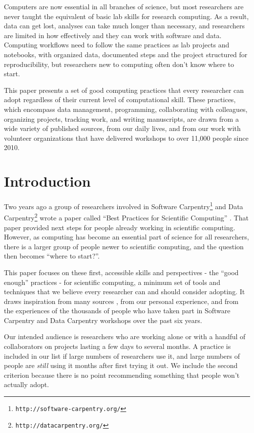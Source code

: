 \documentclass[10pt,letterpaper]{article}
\newcommand{\withurl}[2]{{#1}\footnote{{\texttt{#2}}}}
\begin{document}
Computers are now essential in all branches of science, but most
researchers are never taught the equivalent of basic lab skills for
research computing. As a result, data can get lost, analyses can take
much longer than necessary, and researchers are limited in how
effectively and they can work with software and data. Computing
workflows need to follow the same practices as lab projects and
notebooks, with organized data, documented steps and the project
structured for reproducibility, but researchers new to computing often
don't know where to start.

This paper presents a set of good computing practices that every
researcher can adopt regardless of their current level of
computational skill.  These practices, which encompass data
management, programming, collaborating with colleagues, organizing
projects, tracking work, and writing manuscripts, are drawn from a
wide variety of published sources, from our daily lives, and from our
work with volunteer organizations that have delivered workshops to
over 11,000 people since 2010.

\linenumbers

\section*{Introduction}\label{sec:introduction}

Two years ago a group of researchers involved in \withurl{Software
Carpentry}{http://software-carpentry.org/} and \withurl{Data
Carpentry}{http://datacarpentry.org/} wrote a paper called ``Best
Practices for Scientific Computing'' \cite{wilson2014}.  That paper
provided next steps for people already working in scientific
computing. However, as computing has become an essential part of
science for all researchers, there is a larger group of people newer
to scientific computing, and the question then becomes ``where to
start?''.

This paper focuses on these first, accessible skills and perspectives
- the ``good enough'' practices - for scientific computing, a minimum
set of tools and techniques that we believe every researcher can and
should consider adopting. It draws inspiration from many sources
\cite{gentzkow2014,noble2009,brown2015,wickham2014,kitzes2016,sandve2013,hart2016},
from our personal experience, and from the experiences of the
thousands of people who have taken part in Software Carpentry and Data
Carpentry workshops over the past six years.

Our intended audience is researchers who are working alone or with a
handful of collaborators on projects lasting a few days to several
months. A practice is included in our list if large numbers of
researchers use it, and large numbers of people are \emph{still} using
it months after first trying it out. We include the second criterion
because there is no point recommending something that people won't
actually adopt.
\end{document}
